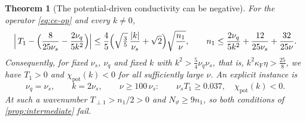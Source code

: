 \documentclass[11pt]{article}
\newcommand{\F}{\kappa_{\mathrm F}}
\newcommand{\pot}{\mathrm{pot}}
\newtheorem{theorem}{Theorem}[section]
\theoremstyle{definition}
\theoremstyle{remark}
\numberwithin{equation}{section}
\begin{document}
\begin{theorem}[The potential-driven conductivity can be negative]\label{thm:ce-negative}
For the operator \eqref{eq:ce-op} and every $k\ne0$,
\begin{equation}
 \Bigl|\,T_1-\Bigl(\frac8{25\nu_s}-\frac{2\nu_q}{5k^2}\Bigr)\Bigr|
 \leq\frac45\Bigl(\sqrt{\tfrac35}\,\frac{|k|}{\nu_s}+\sqrt2\Bigr)
     \sqrt{\frac{n_1}{\nu}},\qquad
 n_1\leq\frac{2\nu_q}{5k^2}+\frac{12}{25\nu_s}+\frac{32}{25\nu}.
 \label{eq:ce-grad}
\end{equation}
Consequently, for fixed $\nu_s$, $\nu_q$ and fixed $k$ with
$k^2>\tfrac54\nu_q\nu_s$, that is, $k^2\F\eta>\tfrac{25}8$, we have
$T_1>0$ and $\chi_\pot(k)<0$ for all sufficiently large $\nu$. An
explicit instance is
\[
 \nu_q=\nu_s,\qquad k=2\nu_s,\qquad \nu\geq100\,\nu_s:\qquad
 \nu_sT_1\geq0.037,\quad\chi_\pot(k)<0 .
\]
At such a wavenumber $T_{\perp1}>n_1/2>0$ and $N_\vartheta\geq9n_1$, so
both conditions of \cref{prop:intermediate} fail.
\end{theorem}
\end{document}
